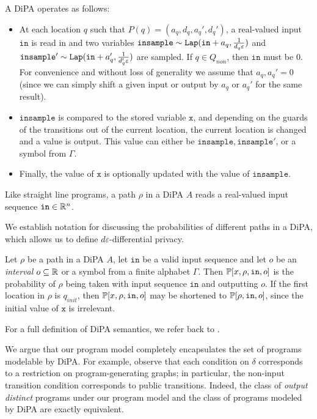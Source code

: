 A DiPA operates as follows: 
\begin{itemize}
    \item At each location $q$ such that $P(q) = (a_q, d_q, a_q', d_q')$, a real-valued input $\texttt{in}$ is read in and two variables $\texttt{insample}\sim \texttt{Lap}(\texttt{in}+a_q, \frac{1}{d_q\varepsilon})$ and $\texttt{insample}'\sim\texttt{Lap}(\texttt{in}+a_q', \frac{1}{d_q'\varepsilon})$ are sampled. If $q\in Q_{non}$, then $\texttt{in}$ must be 0. 
    For convenience and without loss of generality we assume that $a_q, a_q' =0$ (since we can simply shift a given input or output by $a_q$ or $a_q'$ for the same result).
    \item $\texttt{insample}$ is compared to the stored variable $\texttt{x}$, and depending on the guards of the transitions out of the current location, the current location is changed and a value is output. This value can either be $\texttt{insample}, \texttt{insample}'$, or a symbol from $\Gamma$.
    \item Finally, the  value of $\texttt{x}$ is optionally updated with the value of $\texttt{insample}$.
\end{itemize}

Like straight line programs, a path $\rho$ in a DiPA $A$ reads a real-valued input sequence $\texttt{in}\in \mathbb{R}^n$.

We establish notation for discussing the probabilities of different paths in a DiPA, which allows us to define $d\varepsilon$-differential privacy. 

\begin{defn} 
    Let $\rho$ be a path in a DiPA $A$, let $\texttt{in}$ be a valid input sequence and let $o$ be an \textit{interval} $o\subseteq \mathbb{R}$ or a symbol from a finite alphabet $\Gamma$.
    Then $\mathbb{P}[x, \rho, \texttt{in}, o]$ is the probability of $\rho$ being taken with input sequence $\texttt{in}$ and outputting $o$. If the first location in $\rho$ is $q_{init}$, then $\mathbb{P}[x, \rho, \texttt{in}, o]$ may be shortened to $\mathbb{P}[\rho, \texttt{in}, o]$, since the initial value of $\texttt{x}$ is irrelevant.
\end{defn}

For a full definition of DiPA semantics, we refer back to \cite{chadhaLinearTimeDecidability2021}. 

We argue that our program model completely encapsulates the set of programs modelable by DiPA. 
For example, observe that each condition on $\delta$ corresponds to a restriction on program-generating graphs; in particular, the non-input transition condition corresponds to public transitions. 
Indeed, the class of \textit{output distinct} programs under our program model and the class of programs modeled by DiPA are exactly equivalent. 

